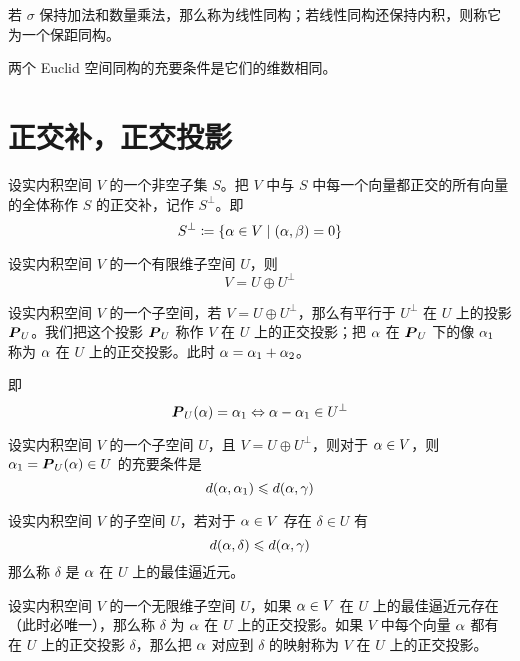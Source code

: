 若 $\sigma$ 保持加法和数量乘法，那么称为线性同构；若线性同构还保持内积，则称它为一个保距同构。

\begin{theorem}
    两个 Euclid 空间同构的充要条件是它们的维数相同。
\end{theorem}

\section{正交补，正交投影}

\begin{definition}
    设实内积空间 $V$ 的一个非空子集 $S$。把 $V$ 中与 $S$ 中每一个向量都正交的所有向量的全体称作 $S$ 的正交补，记作 $S^\bot$。即
    \[ S^\bot \coloneqq \{ \alpha \in V \mid (\alpha,\beta) = 0 \} \]
\end{definition}

\begin{theorem}
    设实内积空间 $V$ 的一个有限维子空间 $U$，则
    \[ V = U \oplus U^\bot \]
\end{theorem}

设实内积空间 $V$ 的一个子空间，若 $V = U \oplus U^\bot$，那么有平行于 $U^\bot$ 在 $U$ 上的投影 $\boldsymbol{P}_U$。我们把这个投影 $\boldsymbol{P}_U$ 称作 $V$ 在 $U$ 上的正交投影；把  $\alpha$ 在 $\boldsymbol{P}_U$ 下的像 $\alpha_1$ 称为 $\alpha$ 在 $U$ 上的正交投影。此时 $\alpha = \alpha_1 + \alpha_2$。

即
\[ \boldsymbol{P}_U(\alpha) = \alpha_1 \Leftrightarrow \alpha - \alpha_1 \in U^\bot \]

\begin{theorem}
    设实内积空间 $V$ 的一个子空间 $U$，且 $V = U \oplus U^\bot$，则对于 $\alpha \in V$，则 $\alpha_1 = \boldsymbol{P}_U(\alpha) \in U$ 的充要条件是
    \[ d(\alpha,\alpha_1) \leqslant d(\alpha,\gamma) \]
\end{theorem}

\begin{definition}
    设实内积空间 $V$ 的子空间 $U$，若对于 $\alpha \in V$ 存在 $\delta \in U$ 有
    \[ d(\alpha,\delta) \leqslant d(\alpha,\gamma) \]
    那么称 $\delta$ 是 $\alpha$ 在 $U$ 上的最佳逼近元。
\end{definition}

设实内积空间 $V$ 的一个无限维子空间 $U$，如果 $\alpha \in V$ 在 $U$ 上的最佳逼近元存在（此时必唯一），那么称 $\delta$ 为 $\alpha$ 在 $U$ 上的正交投影。如果 $V$ 中每个向量 $\alpha$ 都有在 $U$ 上的正交投影 $\delta$，那么把 $\alpha$ 对应到 $\delta$ 的映射称为 $V$ 在 $U$ 上的正交投影。

